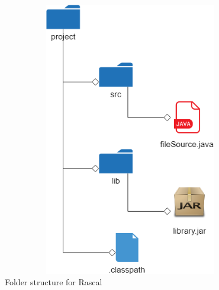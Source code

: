 \begin{figure}[!h]
\includegraphics[width=12cm,height=12cm,keepaspectratio]{images/Folders.png}
\centering
  \caption{Folder structure for Rascal}
  \label{fig:cmd}
\end{figure}

